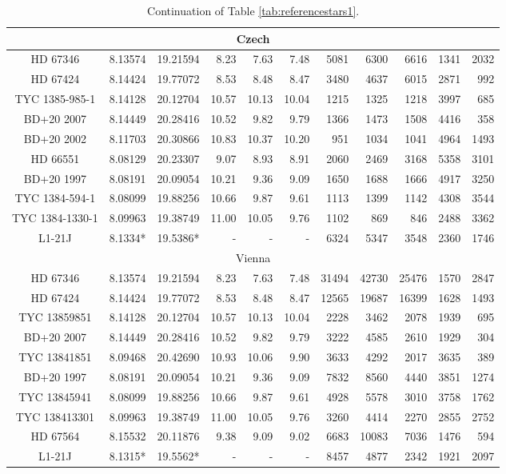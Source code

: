 \begin{table*}
{\begin{tabular}{c|cc|rrr|rrr|rr}
\hline
\multicolumn{11}{c}{Czech}\\
\hline
HD 67346 & 8.13574 & 19.21594 & 8.23 & 7.63 & 7.48 & 5081 & 6300 & 6616 & 1341 & 2032\\
HD 67424 & 8.14424 & 19.77072 & 8.53 & 8.48 & 8.47 & 3480 & 4637 & 6015 & 2871 & 992\\
TYC 1385-985-1 & 8.14128 & 20.12704 & 10.57 & 10.13 & 10.04 & 1215 & 1325 & 1218 & 3997 & 685\\
BD+20 2007 & 8.14449 & 20.28416 & 10.52 & 9.82 & 9.79 & 1366 & 1473 & 1508 & 4416 & 358\\
BD+20 2002 & 8.11703 & 20.30866 & 10.83 & 10.37 & 10.20 & 951 & 1034 & 1041 & 4964 & 1493\\
HD 66551 & 8.08129 & 20.23307 & 9.07 & 8.93 & 8.91 & 2060 & 2469 & 3168 & 5358 & 3101\\
BD+20 1997 & 8.08191 & 20.09054 & 10.21 & 9.36 & 9.09 & 1650 & 1688 & 1666 & 4917 & 3250\\
TYC 1384-594-1 & 8.08099 & 19.88256 & 10.66 & 9.87 & 9.61 & 1113 & 1399 & 1142 & 4308 & 3544\\
TYC 1384-1330-1 & 8.09963 & 19.38749 & 11.00 & 10.05 & 9.76 & 1102 & 869 & 846 & 2488 & 3362\\
L1-21J & 8.1334* & 19.5386* & - & - & - & 6324 & 5347 & 3548 & 2360 & 1746\\

\hline
\multicolumn{11}{c}{Vienna}\\
\hline
HD 67346 & 8.13574 & 19.21594 & 8.23 & 7.63 & 7.48 & 31494 & 42730 & 25476 & 1570 & 2847\\
HD 67424 & 8.14424 & 19.77072 & 8.53 & 8.48 & 8.47 & 12565 & 19687 & 16399 & 1628 & 1493\\
TYC 13859851 & 8.14128 & 20.12704 & 10.57 & 10.13 & 10.04 & 2228 & 3462 & 2078 & 1939 & 695\\
BD+20 2007 & 8.14449 & 20.28416 & 10.52 & 9.82 & 9.79 & 3222 & 4585 & 2610 & 1929 & 304\\
TYC 13841851 & 8.09468 & 20.42690 & 10.93 & 10.06 & 9.90 & 3633 & 4292 & 2017 & 3635 & 389\\
BD+20 1997 & 8.08191 & 20.09054 & 10.21 & 9.36 & 9.09 & 7832 & 8560 & 4440 & 3851 & 1274\\
TYC 13845941 & 8.08099 & 19.88256 & 10.66 & 9.87 & 9.61 & 4928 & 5578 & 3010 & 3758 & 1762\\
TYC 138413301 & 8.09963 & 19.38749 & 11.00 & 10.05 & 9.76 & 3260 & 4414 & 2270 & 2855 & 2752\\
HD 67564 & 8.15532 & 20.11876 & 9.38 & 9.09 & 9.02 & 6683 & 10083 & 7036 & 1476 & 594\\
L1-21J & 8.1315* & 19.5562* & - & - & - & 8457 & 4877 & 2342 & 1921 & 2097\\

\hline\hline
\end{tabular}}
\caption{Continuation of Table \ref{tab:referencestars1}.\label{tab:referencestars2}}
\end{table*}
